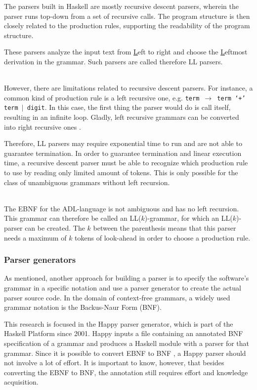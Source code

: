 The parsers built in Haskell are mostly recursive descent parsers, wherein the parser runs top-down from a set of recursive calls.
The program structure is then closely related to the production rules, supporting the readability of the program structure.

These parsers analyze the input text from \underline{L}eft to right and choose the \underline{L}eftmost derivation in the grammar.
Such parsers are called therefore LL parsers.

~\\
However, there are limitations related to recursive descent parsers.
For instance, a common kind of production rule is a left recursive one, e.g. \texttt{term $\rightarrow$ term `$+$' term $|$ digit}.
In this case, the first thing the parser would do is call itself, resulting in an infinite loop.
Gladly, left recursive grammars can be converted into right recursive ones \cite{remove-left}.

Therefore, LL parsers may require exponential time to run and are not able to guarantee termination.
In order to guarantee termination and linear execution time, a recursive descent parser must be able to recognize which production rule to use by reading only limited amount of tokens.
This is only possible for the class of unambiguous grammars without left recursion.

~\\
%
%
The EBNF for the ADL-language is not ambiguous and has no left recursion.
This grammar can therefore be called an LL($k$)-grammar, for which an LL($k$)-parser can be created.
The $k$ between the parenthesis means that this parser needs a maximum of $k$ tokens of look-ahead in order to choose a production rule.

\subsubsection{Parser generators}
As mentioned, another approach for building a parser is to specify the software's grammar in a specific notation and use a parser generator to create the actual parser source code.
In the domain of context-free grammars, a widely used grammar notation is the Backus-Naur Form (BNF).

%
This research is focused in the Happy parser generator, which is part of the Haskell Platform since 2001.
Happy inputs a file containing an annotated BNF specification of a grammar and produces a Haskell module with a parser for that grammar.
Since it is possible to convert EBNF to BNF \cite{convert-ebnf,bnf-ebnf}, a Happy parser should not involve a lot of effort.
It is important to know, however, that besides converting the EBNF to BNF, the annotation still requires effort and knowledge acquisition.

